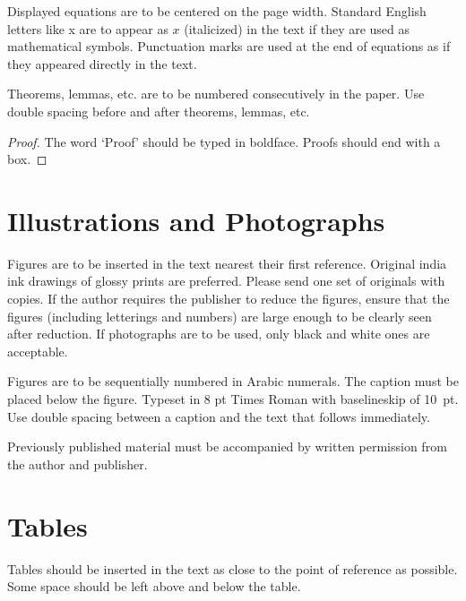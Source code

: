\documentclass{ws-ijait}
\begin{document}
Displayed equations are to be centered on the page width.
Standard English letters like x are to appear as $x$
(italicized) in the text if they are used as mathematical
symbols. Punctuation marks are used at the end of equations as
if they appeared directly in the text.

\begin{theorem}
Theorems, lemmas, etc. are to be numbered
consecutively in the paper. Use double spacing before and after
theorems, lemmas, etc.
\end{theorem}

\begin{proof}
The word `Proof' should be typed in boldface. Proofs should end with
a box.
\end{proof}

\section{Illustrations and Photographs}

Figures are to be inserted in the text nearest their first
reference.  Original india ink drawings of glossy prints are
preferred. Please send one set of originals with copies. If the
author requires the publisher to reduce the figures, ensure that
the figures (including letterings and numbers) are large enough
to be clearly seen after reduction. If photographs are to be
used, only black and white ones are acceptable.


Figures are to be sequentially numbered in Arabic numerals. The
caption must be placed below the figure. Typeset in 8 pt Times
Roman with baselineskip of 10~pt. Use double spacing between a
caption and the text that follows immediately.

Previously published material must be accompanied by written
permission from the author and publisher.

\section{Tables}

Tables should be inserted in the text as close to the point of
reference as possible. Some space should be left above and below
the table.
\end{document}
